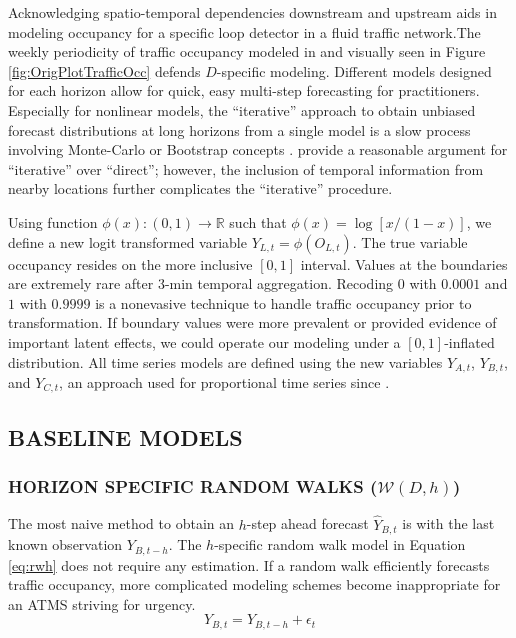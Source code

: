 Acknowledging spatio-temporal dependencies downstream and upstream aids in modeling occupancy for a specific loop detector in a fluid traffic network\citep{Kamarianakis2005,Min2010,Min2011,Stathopoulos2003}.The weekly periodicity of traffic occupancy modeled in \cite{Williams1999,Ghosh2007,Kamarianakis2010} and visually seen in Figure \ref{fig:OrigPlotTrafficOcc} defends $D$-specific modeling. Different models designed for each horizon allow for quick, easy multi-step forecasting for practitioners. Especially for nonlinear models, the ``iterative'' approach to obtain unbiased forecast distributions at long horizons from a single model is a slow process involving Monte-Carlo or Bootstrap concepts \citep{Peguin1994,Lundbergh2002}. \cite{Marcellino2006} provide a reasonable argument for ``iterative'' over ``direct''; however, the inclusion of temporal information from nearby locations further complicates the ``iterative'' procedure.

Using function $\phi(x):(0,1)\to\mathbb{R}$ such that $\phi(x)=\log [x/(1-x)]$, we define a new logit transformed variable $Y_{L,t}=\phi(O_{L,t})$. The true variable occupancy resides on the more inclusive $[0,1]$ interval. Values at the boundaries are extremely rare after 3-min temporal aggregation. Recoding $0$ with $0.0001$ and $1$ with $0.9999$ is a nonevasive technique to handle traffic occupancy prior to transformation. If boundary values were more prevalent or provided evidence of important latent effects, we could operate our modeling under a $[0,1]$-inflated distribution. All time series models are defined using the new variables $Y_{A,t}$, $Y_{B,t}$, and $Y_{C,t}$, an approach used for proportional time series since \cite{Wallis1987}. 

\subsection{BASELINE MODELS}

\subsubsection{HORIZON SPECIFIC RANDOM WALKS ($\mathcal{W}(D,h)$)}
The most naive method to obtain an $h$-step ahead forecast $\widehat{Y}_{B,t}$ is with the last known observation $Y_{B,t-h}$. The $h$-specific random walk model in Equation \ref{eq:rwh} does not require any estimation. If a random walk efficiently forecasts traffic occupancy, more complicated modeling schemes become inappropriate for an ATMS striving for urgency.
\begin{equation}
\label{eq:rwh}
Y_{B,t}=Y_{B,t-h}+\epsilon_t
\end{equation}

